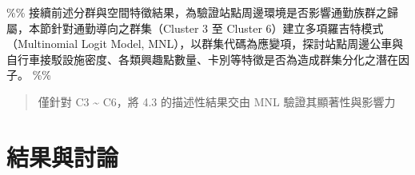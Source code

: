 \%\%
接續前述分群與空間特徵結果，為驗證站點周邊環境是否影響通勤族群之歸屬，本節針對通勤導向之群集（Cluster
3 至 Cluster 6）建立多項羅吉特模式（Multinomial Logit Model,
MNL），以群集代碼為應變項，探討站點周邊公車與自行車接駁設施密度、各類興趣點數量、卡別等特徵是否為造成群集分化之潛在因子。
\%\%

\begin{quote}
僅針對 C3 \textasciitilde{} C6，將 4.3 的描述性結果交由 MNL
驗證其顯著性與影響力
\end{quote}

\section{結果與討論}\label{ux7d50ux679cux8207ux8a0eux8ad6}
